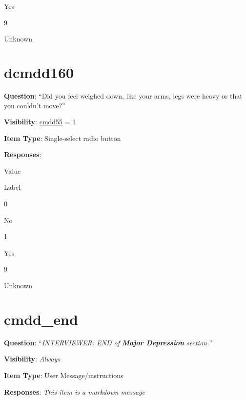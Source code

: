 \documentclass[
]{book}
\begin{document}
Yes

9

Unknown

\hypertarget{dcmdd160}{%
\section{dcmdd160}\label{dcmdd160}}

\textbf{Question}: ``Did you feel weighed down, like your arms, legs were heavy or that you couldn't move?''

\textbf{Visibility}: \protect\hyperlink{cmdd55}{cmdd55} = 1

\textbf{Item Type}: Single-select radio button

\textbf{Responses}:

Value

Label

0

No

1

Yes

9

Unknown

\hypertarget{cmdd_end}{%
\section{cmdd\_end}\label{cmdd_end}}

\textbf{Question}: ``\emph{INTERVIEWER: END of \textbf{Major Depression} section.}''

\textbf{Visibility}: \emph{Always}

\textbf{Item Type}: User Message/instructions

\textbf{Responses}: \emph{This item is a markdown message}

  
\end{document}
